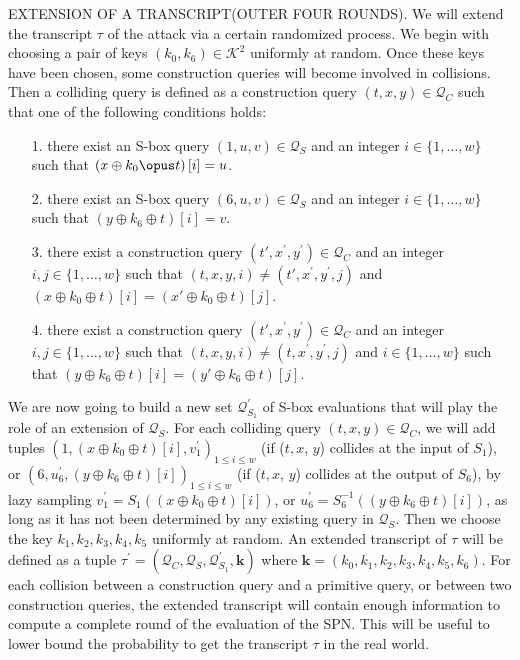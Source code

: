 \noindent
\textsc{EXTENSION OF A TRANSCRIPT(OUTER FOUR ROUNDS)}. We will extend the transcript $\tau$ of the attack via a certain randomized process. We begin with choosing a pair of keys $\left(k_{0}, k_{6}\right) \in \mathcal{K}^{2}$ uniformly at random. Once these keys have been chosen, some construction queries will become involved in collisions. Then a colliding query is defined as a construction query $(t, x, y) \in \mathcal{Q}_{C}$ such that one of the following conditions holds:

\begin{itemize}
  \item[1.]
  there exist an S-box query $(1, u, v) \in \mathcal{Q}_{S}$ and an integer $i \in\{1, \ldots, w\}$ such that $\left(x \oplus k_{0} \opus t \right)[i]=u$.
  \item[2.]
  there exist an S-box query $(6, u, v) \in \mathcal{Q}_{S}$ and an integer $i \in\{1, \ldots, w\}$ such that $\left(y \oplus k_{6} \oplus t \right)[i]=v$.
  \item[3.]
  there exist a construction query $\left(t', x^{\prime}, y^{\prime}\right) \in \mathcal{Q}_{C}$ and an integer $i,j \in\{1, \ldots, w\}$ such that $(t, x, y, i) \neq\left(t', x^{\prime}, y^{\prime}, j\right)$ and $\left(x \oplus k_{0} \oplus t \right)[i] = \left(x' \oplus k_{0} \oplus t \right)[j]$.
  \item[4.]
  there exist a construction query $\left(t', x^{\prime}, y^{\prime}\right) \in \mathcal{Q}_{C}$ and an integer $i,j \in\{1, \ldots, w\}$ such that $(t, x, y, i) \neq\left(t, x^{\prime}, y^{\prime}, j\right)$ and $i \in\{1, \ldots, w\}$ such that $\left(y \oplus k_{6} \oplus t \right)[i] = \left(y' \oplus k_{6} \oplus t\right)[j]$.
\end{itemize}

We are now going to build a new set $\mathcal{Q}_{S_{1}}^{\prime}$ of S-box evaluations that will play the role of an extension of $\mathcal{Q}_{S}$. For each colliding query $(t, x, y) \in \mathcal{Q}_{C}$, we will add tuples $\left(1, \left(x \oplus k_{0} \oplus t\right)[i], v_1^{\prime}\right)_{1 \leq i \leq w}$ (if ($t, \mathit{x}$, $\mathit{y}$) collides at the input of $S_1$), or $\left(6, u_6^{\prime}, \left(y \oplus k_{6} \oplus t\right)[i]\right)_{1 \leq i \leq w}$ (if ($t, \mathit{x}$, $\mathit{y}$) collides at the output of $S_6$), by lazy sampling $v_1^{\prime}=S_{1}(\left(x \oplus k_{0} \oplus t\right)[i])$, or $u_6^{\prime}=S_{6}^{-1}(\left(y \oplus k_{6} \oplus t\right)[i])$, as long as it has not been determined by any existing query in $\mathcal{Q}_{S}$. Then we choose the key $k_1, k_2, k_3, k_4, k_5$ uniformly at random. An extended transcript of $\tau$ will be defined as a tuple $\tau^{\prime}=\left(\mathcal{Q}_{C}, \mathcal{Q}_{S}, \mathcal{Q}_{S_{1}}^{\prime}, \mathbf{k}\right)$ where $\mathbf{k}=\left(k_{0}, k_{1}, k_{2},k_{3},k_{4}, k_{5}, k_{6}\right)$. For each collision between a construction query and a primitive query, or between two construction queries, the extended transcript will contain enough information to compute a complete round of the evaluation of the SPN. This will be useful to lower bound the probability to get the transcript $\tau$ in the real world.\\

